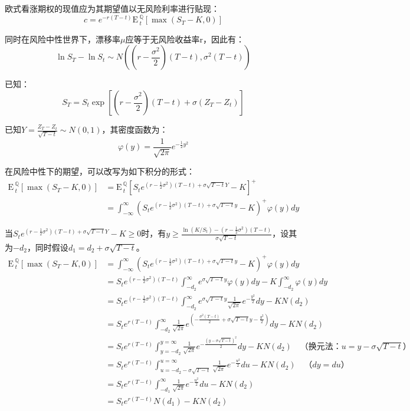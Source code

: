 \documentclass[11pt]{article}
\def\E{{\textrm{E}}\,}
\begin{document}
欧式看涨期权的现值应为其期望值以无风险利率进行贴现：
\begin{equation*}
    c = e^{-r(T-t)} \E^\mathbb{Q}_t \left[ \max(S_T-K,0) \right]
\end{equation*}

同时在风险中性世界下，漂移率$\mu$应等于无风险收益率r，因此有：
\begin{equation*}
    \ln S_T - \ln S_t \sim N \left((r-\frac{\sigma^2}{2})(T-t), \sigma^2(T-t)\right)
\end{equation*}

已知：
\begin{equation*}
    S_T = S_t \exp\left[\left(r-\frac{\sigma^2}{2}\right)\left(T-t\right) + \sigma\left(Z_T - Z_t \right)\right]
\end{equation*}

已知$Y = \frac{Z_T - Z_t}{\sqrt{T-t}} \sim N(0,1)$，其密度函数为：
\begin{equation*}
    \varphi(y) = \frac{1}{\sqrt{2\pi}} e^{-\frac{1}{2}y^2}
\end{equation*}

在风险中性下的期望，可以改写为如下积分的形式：
\begin{align*}
    \E^\mathbb{Q}_t \left[ \max(S_T-K,0) \right] & = \E^\mathbb{Q}_t \left[ S_t e^{(r-\frac{1}{2}\sigma^2)(T-t) + \sigma\sqrt{T-t}Y} - K \right]^+ \\
    & = \int_{-\infty}^{\infty} \left( S_t e^{(r-\frac{1}{2}\sigma^2)(T-t) + \sigma\sqrt{T-t}y} - K \right)^+ \varphi(y) dy
\end{align*}

当$S_t e^{(r-\frac{1}{2}\sigma^2)(T-t) + \sigma\sqrt{T-t}Y} - K \geq 0$时，有$y \geq \frac{ \ln (K/S_t) - (r-\frac{1}{2}\sigma^2)(T-t)}{\sigma\sqrt{T-t}}$，设其为$-d_2$，同时假设$d_1 = d_2 + \sigma \sqrt{T-t}$。
\begin{align*}
    \E^\mathbb{Q}_t \left[ \max(S_T-K,0) \right] & = \int_{-\infty}^{\infty} \left( S_t e^{(r-\frac{1}{2}\sigma^2)(T-t) + \sigma\sqrt{T-t}y} - K \right)^+ \varphi(y) dy \\
    & = S_t e^{(r-\frac{1}{2}\sigma^2)(T-t)} \int_{-d_2}^{\infty} e^{\sigma\sqrt{T-t} y} \varphi(y)dy - K\int_{-d_2}^{\infty} \varphi(y)dy \\
    & = S_t e^{(r-\frac{1}{2} \sigma^2) (T-t)} \int_{-d_2}^{\infty}{e^{\sigma\sqrt{T-t}y} \frac{1}{\sqrt{2\pi\ }}e^{-\frac{y^2}{2}}dy} - KN\left(d_2\right) \\
    & = S_t e^{r(T-t)} \int_{-d_2}^{\infty} \frac{1}{\sqrt{2\pi}} e^{\left( -\frac{\sigma^2 (T-t)}{2} + \sigma\sqrt{T-t}y - \frac{y^2}{2} \right)} dy - KN(d_2) \\
    & = S_t e^{r(T-t)} \int_{y = -d_2}^{y = \infty} \frac{1}{\sqrt{2\pi}}e^{-\frac{\left(y-\sigma\sqrt{T-t}\right)^2}{2}}dy - KN(d_2) \quad \text{（换元法：$u =y -\sigma\sqrt{T-t}$）} \\
    & =S_t e^{r(T-t)} \int_{u = -d_2-\sigma\sqrt{T-t}}^{u = \infty} \frac{1}{\sqrt{2\pi\ }}e^{-\frac{u^2}{2}}du - KN(d_2) \quad \text{（$dy = du$）} \\
    & = S_t e^{r(T-t)} \int_{-d_1}^{\infty} \frac{1}{\sqrt{2\pi}}e^{-\frac{u^2}{2}} du - KN(d_2) \\
    & = S_t e^{r(T-t)}N(d_1) - KN(d_2)
\end{align*}
\end{document}
